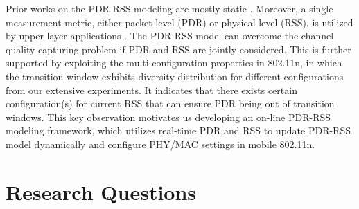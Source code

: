 \documentclass[journal,onecolumn,12pt]{IEEEtran}
\begin{document}
Prior works on the PDR-RSS modeling are mostly static \cite{kashyap2007capacity} \cite{kolar2011mesh} \cite{reis2006model}. Moreover, a single measurement metric, either packet-level (PDR) or physical-level (RSS), is utilized by upper layer applications\cite{judd2008efficient} \cite{zhang2008practical}. The PDR-RSS model can overcome the channel quality capturing problem if PDR and RSS are jointly considered. This is further supported by exploiting the multi-configuration properties in 802.11n, in which the transition window exhibits diversity distribution for different configurations from our extensive experiments. It indicates that there exists certain configuration(s) for current RSS that can ensure PDR being out of transition windows. This key observation motivates us developing an on-line PDR-RSS modeling framework, which utilizes real-time PDR and RSS to update PDR-RSS model dynamically and configure PHY/MAC settings in mobile 802.11n.
%
%
%
%
%
%

\section{Research Questions}
\end{document}
